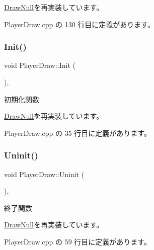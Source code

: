 \mbox{\hyperlink{class_draw_null_a3b51dfd629853a461cc50175de94ee03}{Draw\+Null}}を再実装しています。



 Player\+Draw.\+cpp の 130 行目に定義があります。

\mbox{\label{class_player_draw_ad79a0fbeb618e0913822b573e5d0be68}} 
\subsubsection{\texorpdfstring{Init()}{Init()}}
{\footnotesize\ttfamily void Player\+Draw\+::\+Init (\begin{DoxyParamCaption}{ }\end{DoxyParamCaption})\hspace{0.3cm}{\ttfamily [override]}, {\ttfamily [virtual]}}



初期化関数 



\mbox{\hyperlink{class_draw_null_acd7fef3ccea1da537ac9507ffbb6dd2e}{Draw\+Null}}を再実装しています。



 Player\+Draw.\+cpp の 35 行目に定義があります。

\mbox{\label{class_player_draw_a917b2947914287f23d87ca75cd68f553}} 
\subsubsection{\texorpdfstring{Uninit()}{Uninit()}}
{\footnotesize\ttfamily void Player\+Draw\+::\+Uninit (\begin{DoxyParamCaption}{ }\end{DoxyParamCaption})\hspace{0.3cm}{\ttfamily [override]}, {\ttfamily [virtual]}}



終了関数 



\mbox{\hyperlink{class_draw_null_a12d44e341c7364b5ab9cdd661dc16187}{Draw\+Null}}を再実装しています。



 Player\+Draw.\+cpp の 59 行目に定義があります。



